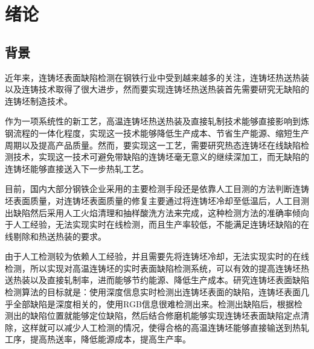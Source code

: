 ﻿%
%
%
%
%
%

\chapter{绪论}

    \section{背景}
    近年来，连铸坯表面缺陷检测在钢铁行业中受到越来越多的关注，连铸坯热送热装以及连铸技术\cite{Association2012World}取得了很大进步，然而要实现连铸坯热送热装首先需要研究无缺陷的连铸坯制造技术。

    作为一项系统性的新工艺，高温连铸坯热送热装及直接轧制技术能够直接影响到炼钢流程的一体化程度，实现这一技术能够降低生产成本、节省生产能源、缩短生产周期以及提高产品质量。然而，要实现这一工艺，需要研究热态连铸坯在线缺陷检测技术，实现这一技术可避免带缺陷的连铸坯毫无意义的继续深加工，而无缺陷的连铸坯能够直接送入下一步热轧工艺。

    目前，国内大部分钢铁企业采用的主要检测手段还是依靠人工目测的方法判断连铸坯表面质量，对连铸坯表面质量的修复主要通过将连铸坯冷却至低温后，人工目测出缺陷然后采用人工火焰清理和抽样酸洗方法来完成，这种检测方法的准确率倾向于人工经验，无法实现实时在线检测，而且生产率较低，不能满足连铸坯缺陷的在线剔除和热送热装的要求。

    由于人工检测较为依赖人工经验，并且需要先将连铸坯冷却，无法实现实时的在线检测，所以实现对高温连铸坯的实时表面缺陷检测系统，可以有效的提高连铸坯热送热装以及直接轧制率，进而能够节约能源、降低生产成本。研究连铸坯表面缺陷检测算法的目标就是：使用深度信息实时检测出连铸坯表面的缺陷，连铸坯表面几乎全部缺陷是深度相关的，使用RGB信息很难检测出来。检测出缺陷后，根据检测出的缺陷位置就能够定位缺陷，然后结合修磨机能够实现连铸坯表面缺陷定点清除，这样就可以减少人工检测的情况，使得合格的高温连铸坯能够直接输送到热轧工序，提高热送率，降低能源成本，提高生产率。

